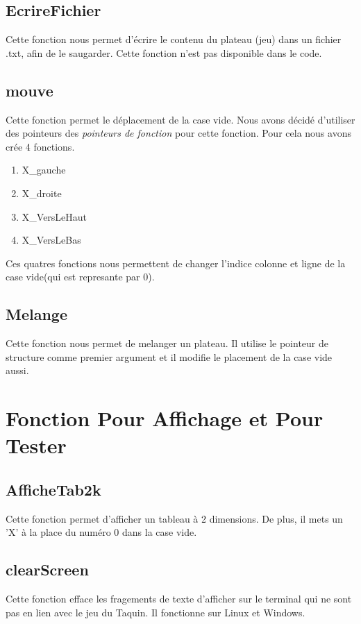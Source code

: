 \documentclass{article}
\begin{document}
\subsection{EcrireFichier}
Cette fonction nous permet d'écrire le contenu du plateau (jeu) dans un fichier .txt, afin de le saugarder.
Cette fonction n'est pas disponible dans le code.

\subsection{mouve}
Cette fonction permet le déplacement de la case vide. Nous avons décidé d'utiliser des pointeurs des \textit{pointeurs de fonction} pour cette fonction. Pour cela nous avons crée 4 fonctions.	

\begin{enumerate}
	\item X\_gauche 			
	\item X\_droite 			
	\item X\_VersLeHaut		
	\item X\_VersLeBas		
\end{enumerate}

Ces quatres fonctions nous permettent de changer l'indice colonne et ligne de la case vide(qui est represante par 0). 
	

\subsection{Melange}
Cette fonction nous permet de melanger un plateau. Il utilise le pointeur de structure comme premier argument et il modifie le placement de la case vide aussi.

\newpage

\section{Fonction Pour Affichage et Pour Tester}

\subsection{AfficheTab2k}
Cette fonction permet d'afficher un tableau à 2 dimensions. De plus, il mets un 'X' à la place du numéro 0 dans la case vide.

\subsection{clearScreen}
Cette fonction efface les fragements de texte d'afficher sur le terminal qui ne sont pas en lien avec le jeu du Taquin. Il fonctionne sur Linux et Windows.
\end{document}
